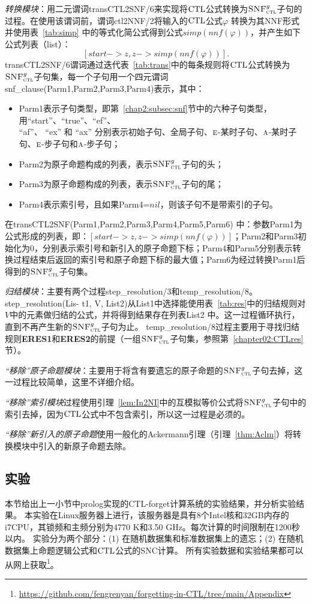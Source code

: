 {\em 转换模块}：用二元谓词transCTL2SNF/6来实现将$\textrm{CTL}$公式转换为${\textsc{SNF}_{\textsc{ctl}}^g}$子句的过程。在使用该谓词前，谓词ctl2NNF/2将输入的$\textrm{CTL}$公式$\varphi$ 转换为其NNF形式并使用表~\ref{tab:simp} 中的等式化简公式得到公式$simp(nnf(\varphi))$，并产生如下公式列表（list）：
$$[start-> z, z -> simp(nnf(\varphi))].$$
transCTL2SNF/6谓词通过迭代表~\ref{tab:trans}中的每条规则将$\textrm{CTL}$公式转换为${\textsc{SNF}_{\textsc{ctl}}^g}$子句集，每一个子句用一个四元谓词snf\_clause(Parm1,Parm2,Parm3,Parm4)表示，其中：
\begin{itemize}
	\item Parm1表示子句类型，即第~\ref{chap2:subsec:snf}节中的六种子句类型，用“start”、“true”、“ef”、\\“af”、 “ex” 和 “ax” 分别表示初始子句、全局子句、$\textsc{e}$-某时子句、$\textsc{a}$-某时子句、$\textsc{e}$-步子句和$\textsc{a}$-步子句；
	\item Parm2为原子命题构成的列表，表示${\textsc{SNF}_{\textsc{ctl}}^g}$子句的头；
	\item Parm3为原子命题构成的列表，表示${\textsc{SNF}_{\textsc{ctl}}^g}$子句的尾；
	\item Parm4表示索引号，且如果Parm4=$nil$，则该子句不是带索引的子句。
\end{itemize}

在transCTL2SNF(Parm1,Parm2,Parm3,Parm4,Parm5,Parm6) 中：参数Parm1为公式形成的列表，即：$[start-> z, z -> simp(nnf(\varphi))]$；Parm2和Parm3初始化为0，分别表示索引号和新引入的原子命题下标；Parm4和Parm5分别表示转换过程结束后返回的索引号和原子命题下标的最大值；Parm6为经过转换Parm1后得到的${\textsc{SNF}_{\textsc{ctl}}^g}$子句集。


{\em 归结模块}：主要有两个过程step\_resolution/3和temp\_resolution/8。step\_resolution(Lis- t1, V, List2)从List1中选择能使用表~\ref{tab:res}中的归结规则对$V$中的元素做归结的公式，并将得到结果存在列表List2 中。这一过程循环执行，直到不再产生新的${\textsc{SNF}_{\textsc{ctl}}^g}$子句为止。
temp\_resolution/8过程主要用于寻找归结规则\textbf{ERES1}和\textbf{ERES2}的前提（一组${\textsc{SNF}_{\textsc{ctl}}^g}$子句集，参照第~\ref{chapter02:CTLres}节）。

{\em “移除”原子命题模块}：主要用于将含有要遗忘的原子命题的${\textsc{SNF}_{\textsc{ctl}}^g}$子句去掉，这一过程比较简单，这里不详细介绍。

{\em “移除”索引模块}过程使用引理~\ref{lem:In2NI}中的互模拟等价公式将${\textsc{SNF}_{\textsc{ctl}}^g}$子句中的索引去掉，因为$\textrm{CTL}$公式中不包含索引，所以这一过程是必须的。

{\em “移除”新引入的原子命题}使用一般化的Ackermann引理（引理~\ref{thm:Aclm}）将转换模块中引入的新原子命题去除。


\subsection{实验}\label{cha5:subsec:expriment}
本节给出上一小节中prolog实现的CTL-forget计算系统的实验结果，并分析实验结果。
本实验在Linux服务器上进行，该服务器是具有8个Intel核和32GB内存的i7CPU，其锁频和主频分别为4770 K和3.50 GHz。每次计算的时间限制在1200秒以内。
	实验分为两个部分：(1) 在随机数据集和标准数据集上的遗忘；(2) 在随机数据集上命题逻辑公式和$\textrm{CTL}$公式的SNC计算。
	所有实验数据和实验结果都可以从网上获取\footnote{ \url{https://github.com/fengrenyan/forgetting-in-CTL/tree/main/Appendix}}。
	
